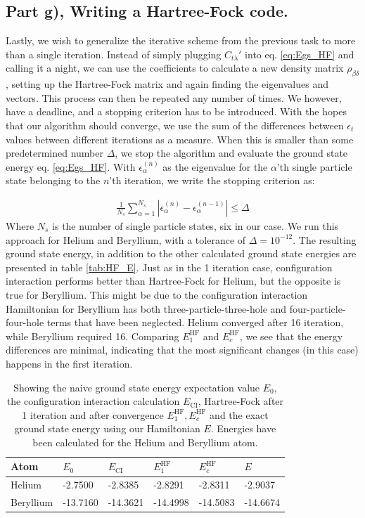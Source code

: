 \documentclass{article}
\newcommand{\hafo}[1]{#1^{\text{HF}}}
\begin{document}
\subsection*{Part g), Writing a Hartree-Fock code.}
    Lastly, we wish to generalize the iterative scheme from  the previous task to more than a single iteration. Instead of simply plugging $C_{t\lambda}'$ into eq. \eqref{eq:Egs_HF} and calling it a night, we can use the coefficients to calculate a new density matrix $\rho_{\beta\delta}$, setting up the Hartree-Fock matrix and again finding the eigenvalues and vectors. This process can then be repeated any number of times. We however, have a deadline, and a stopping criterion has to be introduced. With the hopes that our algorithm should converge, we use the sum of the differences between $\epsilon_t$ values between different iterations as a measure. When this is smaller than some predetermined number $\Delta$, we stop the algorithm and evaluate the ground state energy eq. \eqref{eq:Egs_HF}. With $\epsilon_\alpha^{(n)}$ as the eigenvalue for the $\alpha$'th single particle state belonging to the $n$'th iteration, we write the stopping criterion as:
    
    \begin{align*}
        \frac{1}{N_s}\sum_{\alpha=1}^{N_s} |\epsilon_\alpha^{(n)}-\epsilon_\alpha^{(n-1)}| \leq \Delta
    \end{align*}
    Where $N_s$ is the number of single particle states, six in our case. We run this approach for Helium and Beryllium, with a tolerance of $\Delta = 10^{-12}$. The resulting ground state energy, in addition to the other calculated ground state energies are presented in table \ref{tab:HF_E}. Just as in the 1 iteration case, configuration interaction performs better than Hartree-Fock for Helium, but the opposite is true for Beryllium. This might be due to the configuration interaction Hamiltonian for Beryllium has both three-particle-three-hole and four-particle-four-hole terms that have been neglected. Helium converged after 16 iteration, while Beryllium required 16. Comparing $\hafo{E_1}$ and $\hafo{E_c}$, we see that the energy differences are minimal, indicating that the most significant changes (in this case) happens in the first iteration. 

    \begin{table}[H]
        \centering
        \begin{tabular}{l|l|l|l|l|l}
        Atom      & $E_0$ & $E_{\text{CI}}$ & $\hafo{E_1}$ & $\hafo{E_c}$ & $E$ \\
        \hline
        Helium    & -2.7500     & -2.8385    & -2.8291 & -2.8311  & -2.9037    \\
        Beryllium & -13.7160     & -14.3621    & -14.4998 & -14.5083  &   -14.6674 
        \end{tabular}
        \caption{Showing the naive ground state energy expectation value $E_0$, the configuration interaction calculation $E_{\text{CI}}$, Hartree-Fock after 1 iteration and after convergence $\hafo{E_1}, \hafo{E_c}$ and the exact ground state energy using our Hamiltonian $E$. Energies have been calculated for the Helium and Beryllium atom. } \label{tab:ALL_E}
    \end{table}
\end{document}
